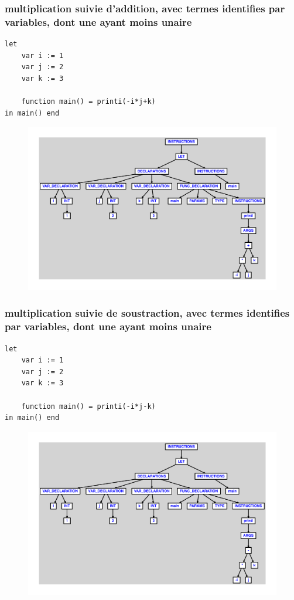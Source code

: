 \documentclass{article}
\begin{document}
\subsubsection{multiplication suivie d'addition, avec termes identifies par variables, dont une ayant moins unaire}
\begin{lstlisting}
let
	var i := 1
	var j := 2
	var k := 3

	function main() = printi(-i*j+k)
in main() end
\end{lstlisting}
\newpage
\begin{figure}[H]
\centering
\includegraphics[max width=\textwidth]{ast/ast_83.pdf}
\end{figure}
\newpage
\subsubsection{multiplication suivie de soustraction, avec termes identifies par variables, dont une ayant moins unaire}
\begin{lstlisting}
let
	var i := 1
	var j := 2
	var k := 3

	function main() = printi(-i*j-k)
in main() end
\end{lstlisting}
\newpage
\begin{figure}[H]
\centering
\includegraphics[max width=\textwidth]{ast/ast_84.pdf}
\end{figure}
\newpage
\end{document}
